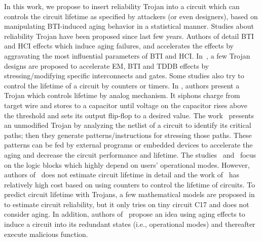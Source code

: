 In this work, we propose to insert reliability Trojan into a circuit which can controls the circuit lifetime as specified by attackers (or even designers), based on manipulating BTI-induced aging behavior in a statistical manner. Studies about reliability Trojan have been proposed since last few years. Authors of \cite{shiyanovskii2010process} detail BTI and HCI effects which induce aging failures, and accelerates the effects by aggravating the most influential parameters of BTI and HCI. In~\cite{sreedhar2012reliability}, a few Trojan designs are proposed to accelerate EM, BTI and TDDB effects by stressing/modifying specific interconnects and gates. Some studies also try to control the lifetime of a circuit by counters or timers. In \cite{yang2016a2}, authors present a Trojan which controls lifetime by analog mechanism. It siphons charge from target wire and stores to a capacitor until voltage on the capacitor rises above the threshold and sets its output flip-flop to a desired value.  The work~\cite{karimi2015magic} presents an unmodified Trojan by analyzing the netlist of a circuit to identify its critical paths; then they generate patterns/instructions for stressing those paths. These patterns can be fed by external programs or embedded devices to accelerate the aging and decrease the circuit performance and lifetime. The studies~\cite{yang2016a2} and~\cite{karimi2015magic} focus on the logic blocks which highly depend on users' operational modes. However, authors of~\cite{shiyanovskii2010process} does not estimate circuit lifetime in detail and the work of~\cite{sreedhar2012reliability} has relatively high cost based on using counters to control the lifetime of circuits. To predict circuit lifetime with Trojans, a few mathematical models are proposed in~\cite{burman2012effect} to estimate circuit reliability, but it only tries on tiny circuit C17 and does not consider aging. In addition, authors of~\cite{wei2013undetectable} propose an idea using aging effects to induce a circuit into its redundant states (i.e., operational modes) and thereafter execute malicious function.

